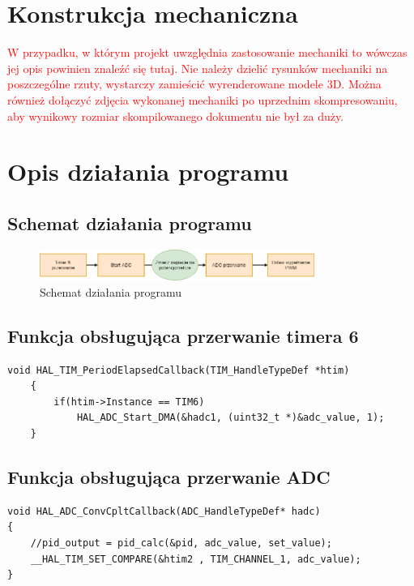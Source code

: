 \documentclass[10pt, a4paper]{article}
\begin{document}
\section{Konstrukcja mechaniczna}
\textcolor{red}{W przypadku, w którym projekt uwzględnia zastosowanie 
	mechaniki to wówczas jej opis powinien znaleźć się tutaj.
	Nie należy dzielić rysunków mechaniki na poszczególne rzuty, 
	wystarczy zamieścić wyrenderowane modele 3D.
	Można również dołączyć zdjęcia wykonanej 
	mechaniki po uprzednim skompresowaniu, aby wynikowy rozmiar 
	skompilowanego dokumentu nie był za duży.}

\section{Opis działania programu}

\subsection{Schemat działania programu}
	\begin{figure}[H]
		\centering
		\includegraphics[width=0.8\textwidth]{figures/diagramPWM.png}
		\caption{Schemat działania programu}
		\label{fig:diagramPWM}
	\end{figure}

\subsection{Funkcja obsługująca przerwanie timera 6}
	\begin{lstlisting}[tabsize=2]
	void HAL_TIM_PeriodElapsedCallback(TIM_HandleTypeDef *htim)
	{
		if(htim->Instance == TIM6)
			HAL_ADC_Start_DMA(&hadc1, (uint32_t *)&adc_value, 1);
	}
	\end{lstlisting}

\subsection{Funkcja obsługująca przerwanie ADC}
\begin{lstlisting}[tabsize=2]
void HAL_ADC_ConvCpltCallback(ADC_HandleTypeDef* hadc)
{
	//pid_output = pid_calc(&pid, adc_value, set_value);
	__HAL_TIM_SET_COMPARE(&htim2 , TIM_CHANNEL_1, adc_value);
}
\end{lstlisting}
\end{document}
